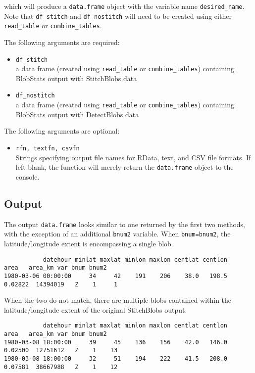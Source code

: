\documentclass{article}
\begin{document}
which will produce a \texttt{data.frame} object with the variable name \texttt{desired\_name}. Note that \texttt{df\_stitch} and \texttt{df\_nostitch} will need to be created using either \texttt{read\_table} or \texttt{combine\_tables}.

The following arguments are required:
\begin{itemize}
\item[] \texttt{df\_stitch}\\ a data frame (created using \texttt{read\_table} or \texttt{combine\_tables}) containing BlobStats output with StitchBlobs data
\item[] \texttt{df\_nostitch}\\ a data frame (created using \texttt{read\_table} or \texttt{combine\_tables}) containing BlobStats output with DetectBlobs data
\end{itemize}

The following arguments are optional:
\begin{itemize}
\item[] \texttt{rfn, textfn, csvfn}\\Strings specifying output file names for RData, text, and CSV file formats. If left blank, the function will merely return the \texttt{data.frame} object to the console.
\end{itemize}

\subsection{Output}

The output \texttt{data.frame} looks similar to one returned by the first two methods, with the exception of an additional \texttt{bnum2} variable. When \texttt{bnum=bnum2}, the latitude/longitude extent is encompassing a single blob.

\begin{verbatim}
           datehour minlat maxlat minlon maxlon centlat centlon    area   area_km var bnum bnum2
1980-03-06 00:00:00     34     42    191    206    38.0   198.5 0.02822  14394019   Z    1     1
\end{verbatim}

When the two do not match, there are multiple blobs contained within the latitude/longitude extent of the original StitchBlobs output.

\begin{verbatim}
           datehour minlat maxlat minlon maxlon centlat centlon    area   area_km var bnum bnum2
1980-03-08 18:00:00     39     45    136    156    42.0   146.0 0.02500  12751612   Z    1    13
1980-03-08 18:00:00     32     51    194    222    41.5   208.0 0.07581  38667988   Z    1    12
\end{verbatim}
\end{document}
